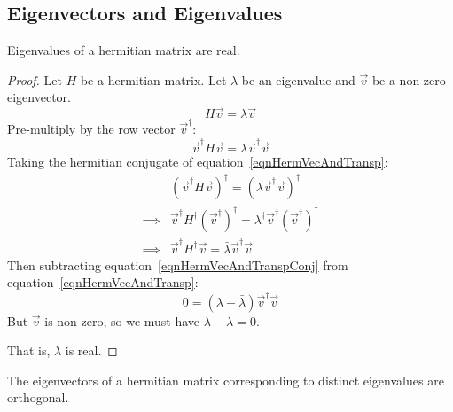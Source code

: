 \documentclass[../Main.tex]{subfiles}
\begin{document}
\subsection{Eigenvectors and Eigenvalues}
\begin{theorem}
    Eigenvalues of a hermitian matrix are real.
    \label{thmHermitianEVals}
\end{theorem}
\begin{proof}
    Let $H$ be a hermitian matrix. Let $\lambda$ be an eigenvalue and $\vec{v}$ be a non-zero eigenvector.
    \begin{equation*}
        H \vec{v} = \lambda \vec{v}
    \end{equation*}
    Pre-multiply by the row vector $\vec{v}^\dagger$:
    \begin{equation}
        \vec{v}^\dagger H \vec{v} = \lambda \vec{v}^\dagger \vec{v}
        \label{eqnHermVecAndTransp}
    \end{equation}
    Taking the hermitian conjugate of equation~\ref{eqnHermVecAndTransp}:
    \begin{align}
       & \left(\vec{v}^\dagger H \vec{v}\right)^\dagger = \left(\lambda \vec{v}^\dagger \vec{v}\right)^\dagger \nonumber \\
       \implies & \vec{v}^\dagger H^\dagger \left(\vec{v}^\dagger\right)^\dagger = \lambda^\dagger \vec{v}^\dagger \left(\vec{v}^\dagger\right)^\dagger \nonumber \\
       \implies & \vec{v}^\dagger H^\dagger \vec{v} = \bar{\lambda} \vec{v}^\dagger \vec{v} \label{eqnHermVecAndTranspConj}
    \end{align}
    Then subtracting equation~\ref{eqnHermVecAndTranspConj} from equation~\ref{eqnHermVecAndTransp}:
    \begin{equation*}
        0 = \left(\lambda - \bar{\lambda}\right)\vec{v}^\dagger \vec{v}
    \end{equation*}
    But $\vec{v}$ is non-zero, so we must have $\lambda - \bar{\lambda} = 0$.\par
    That is, $\lambda$ is real.
\end{proof}
\begin{theorem}
    The eigenvectors of a hermitian matrix corresponding to distinct eigenvalues are orthogonal.
    \label{thmHermitianEVecs}
\end{theorem}
\end{document}
